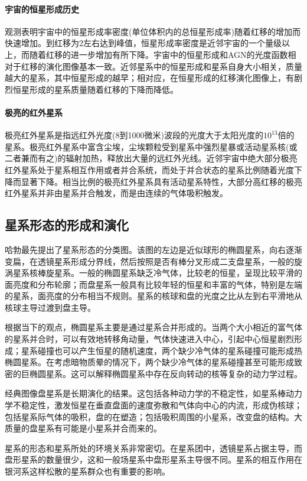 \paragraph{宇宙的恒星形成历史}观测表明宇宙中的恒星形成率密度(单位体积内的总恒星形成率)随着红移的增加而快速增加。到红移为2左右达到峰值，恒星形成率密度是近邻宇宙的一个量级以上，而随着红移的进一步增加有所下降。宇宙中的恒星形成和AGN的光度函数相对于红移的演化图像基本一致。近邻星系中的恒星形成和星系自身大小相关，质量越大的星系，其中恒星形成的越早；相对应，在恒星形成的红移演化图像上，有剧烈恒星形成的星系质量随着红移的下降而降低。
\paragraph{极亮的红外星系}极亮红外星系是指远红外光度(8到1000微米)波段的光度大于太阳光度的$10^{13}$倍的星系。极亮红外星系中富含尘埃，尘埃颗粒受到星系中强烈星暴或活动星系核(或二者兼而有之)的辐射加热，释放出大量的远红外光线。近邻宇宙中绝大部分极亮红外星系处于星系相互作用或者并合系统，而处于并合状态的星系比例随着光度下降而显著下降。相当比例的极亮红外星系具有活动星系特性，大部分高红移的极亮红外星系并非由星系并合触发，而是由连续的气体吸积触发。
\subsection{星系形态的形成和演化}哈勃最先提出了星系形态的分类图。该图的左边是近似球形的椭圆星系，向右逐渐变扁，在透镜星系形成分界线，然后按照是否有棒分叉形成二支盘星系，一般的旋涡星系核棒旋星系。一般的椭圆星系缺乏冷气体，比较老的恒星，呈现比较平滑的面亮度和分布轮廓；而盘星系一般具有比较年轻的恒星和丰富的气体，特别是左端的星系，面亮度的分布相当不规则。星系的核球和盘的光度之比从左到右平滑地从核球主导过渡到盘主导。

根据当下的观点，椭圆星系主要是通过星系合并形成的。当两个大小相近的富气体的星系并合时，可以有效地转移角动量，气体快速进入中心，引起中心恒星剧烈形成；星系碰撞也可以产生恒星的随机速度，两个缺少冷气体的星系碰撞可能形成热椭圆星系。在考虑暗物质晕的情况下，两个缺少冷气体的星系碰撞甚至可能形成致密的巨椭圆星系。这可以解释椭圆星系中存在反向转动的核等复杂的动力学过程。

经典图像盘星系是长期演化的结果。这包括各种动力学的不稳定性，如星系棒动力学不稳定性，激发恒星在垂直盘面的速度弥散和气体向中心的内流，形成伪核球；包括星系际气体的吸积，盘的在塑造；包括吸积周围的小星系，改变盘的结构。大质量的盘星系有可能是小星系并合而来的。

星系的形态和星系所处的环境关系非常密切。在星系团中，透镜星系占据主导，而盘形星系的数量很少，这和一般场星系中盘形星系主导很不同。星系的相互作用在银河系这样松散的星系群众也有重要的影响。
